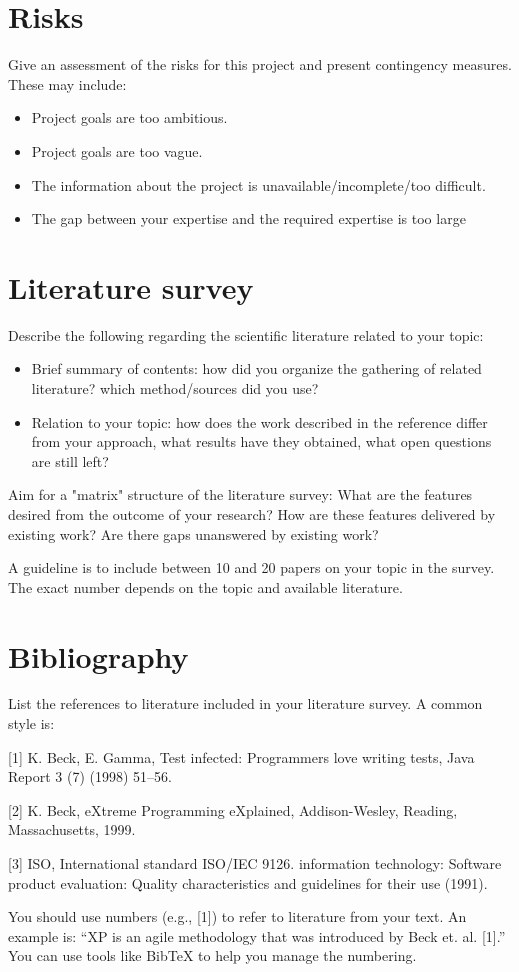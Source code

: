 \documentclass{article}
\begin{document}
\section{Risks} 
Give an assessment of the risks for this project and present contingency measures. These may include:
\begin{itemize}
    \item Project goals are too ambitious.
	\item	  Project goals are too vague.
	\item	  The information about the project is unavailable/incomplete/too difficult.
	\item	  The gap between your expertise and the required expertise is too large 
\end{itemize}
		  

\section{Literature survey}
Describe the following regarding the scientific literature related to your topic:
\begin{itemize}
    \item 	Brief summary of contents: how did you organize the gathering of related literature? which method/sources did you use?
	\item	Relation to your topic: how does the work described in the reference differ from your approach, what results have they obtained, what open questions are still left?
\end{itemize}
Aim for a "matrix" structure of the literature survey: What are the features desired from the outcome of your research? How are these features delivered by existing work? Are there gaps unanswered by existing work? 

A guideline is to include between 10 and 20 papers on your topic in the survey. The exact number depends on the topic and available literature.

\section{Bibliography}
List the references to literature included in your literature survey. A common style is:

[1] K. Beck, E. Gamma, Test infected: Programmers love writing tests, Java Report 3 (7) (1998) 51–56.

[2] K. Beck, eXtreme Programming eXplained, Addison-Wesley, Reading, Massachusetts, 1999.

[3] ISO, International standard ISO/IEC 9126. information technology: Software product evaluation: Quality characteristics and guidelines for their use (1991).

You should use numbers (e.g., [1]) to refer to literature from your text. An example is: “XP is an agile methodology that was introduced by Beck et. al. [1].” You can use tools like BibTeX to help you manage the numbering.
\end{document}
